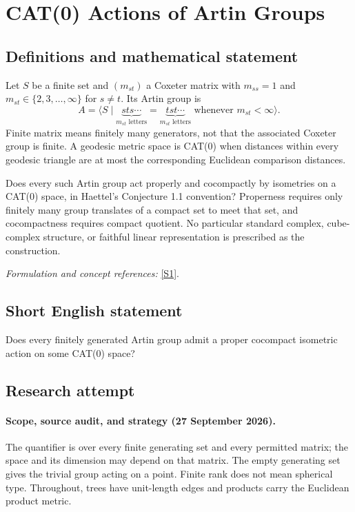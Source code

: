 \documentclass[11pt]{article}
\begin{document}
\section*{\texorpdfstring{CAT(0) Actions of Artin Groups}{CAT(0) Actions of Artin Groups}}\label{30002538}
\subsection{Definitions and mathematical statement}
Let $S$ be a finite set and $(m_{st})$ a Coxeter matrix with $m_{ss}=1$ and $m_{st}\in\{2,3,\ldots,\infty\}$ for $s\ne t$. Its Artin group is
\[
 A=\langle S\mid
 \underbrace{sts\cdots}_{m_{st}\text{ letters}}=
 \underbrace{tst\cdots}_{m_{st}\text{ letters}}
 \text{ whenever }m_{st}<\infty\rangle.
\]
Finite matrix means finitely many generators, not that the associated Coxeter group is finite. A geodesic metric space is CAT(0) when distances within every geodesic triangle are at most the corresponding Euclidean comparison distances.

Does every such Artin group act properly and cocompactly by isometries on a CAT(0) space, in Haettel's Conjecture 1.1 convention? Properness requires only finitely many group translates of a compact set to meet that set, and cocompactness requires compact quotient. No particular standard complex, cube-complex structure, or faithful linear representation is prescribed as the construction.
\par\smallskip\textit{Formulation and concept references:} \href{https://www.numdam.org/item/10.5802/aif.3524.pdf}{[S1]}.

\subsection{Short English statement}
Does every finitely generated Artin group admit a proper cocompact isometric action on some CAT(0) space?
\subsection{Research attempt}

\paragraph{Scope, source audit, and strategy (27 September 2026).}
The quantifier is over every finite generating set and every permitted matrix;
the space and its dimension may depend on that matrix. The empty generating
set gives the trivial group acting on a point. Finite rank does not mean
spherical type. Throughout, trees have unit-length edges and products carry
the Euclidean product metric.
\end{document}
